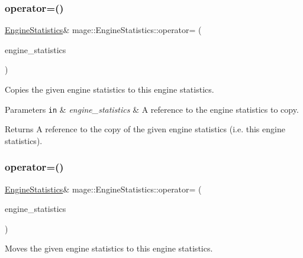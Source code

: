 \subsubsection{\texorpdfstring{operator=()}{operator=()}\hspace{0.1cm}{\footnotesize\ttfamily [1/2]}}
{\footnotesize\ttfamily \hyperlink{classmage_1_1_engine_statistics}{Engine\+Statistics}\& mage\+::\+Engine\+Statistics\+::operator= (\begin{DoxyParamCaption}\item[{const \hyperlink{classmage_1_1_engine_statistics}{Engine\+Statistics} \&}]{engine\+\_\+statistics }\end{DoxyParamCaption})\hspace{0.3cm}{\ttfamily [default]}}

Copies the given engine statistics to this engine statistics.


\begin{DoxyParams}[1]{Parameters}
\mbox{\tt in}  & {\em engine\+\_\+statistics} & A reference to the engine statistics to copy. \\
\hline
\end{DoxyParams}
\begin{DoxyReturn}{Returns}
A reference to the copy of the given engine statistics (i.\+e. this engine statistics). 
\end{DoxyReturn}
\hypertarget{classmage_1_1_engine_statistics_a4674d3856fee372e05f1bed017e46d5b}{}\label{classmage_1_1_engine_statistics_a4674d3856fee372e05f1bed017e46d5b} 
\subsubsection{\texorpdfstring{operator=()}{operator=()}\hspace{0.1cm}{\footnotesize\ttfamily [2/2]}}
{\footnotesize\ttfamily \hyperlink{classmage_1_1_engine_statistics}{Engine\+Statistics}\& mage\+::\+Engine\+Statistics\+::operator= (\begin{DoxyParamCaption}\item[{\hyperlink{classmage_1_1_engine_statistics}{Engine\+Statistics} \&\&}]{engine\+\_\+statistics }\end{DoxyParamCaption})\hspace{0.3cm}{\ttfamily [default]}}

Moves the given engine statistics to this engine statistics.


